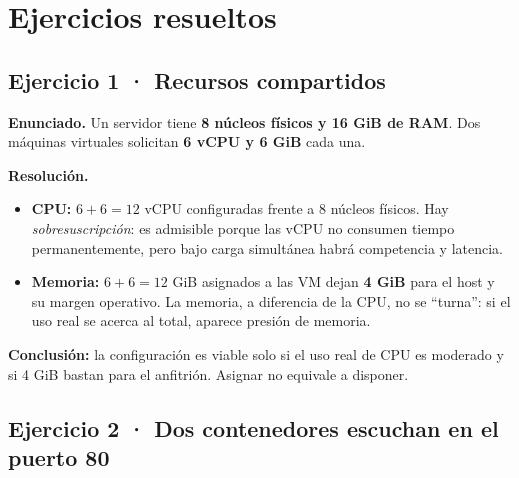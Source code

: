 \documentclass[11pt,a4paper]{article}
\begin{document}
\section{Ejercicios resueltos}

\subsection*{Ejercicio 1 · Recursos compartidos}

\textbf{Enunciado.} Un servidor tiene \textbf{8 núcleos físicos y 16 GiB de RAM}.
Dos máquinas virtuales solicitan \textbf{6 vCPU y 6 GiB} cada una.

\begin{center}
\end{center}

\textbf{Resolución.}
\begin{itemize}
  \item \textbf{CPU:} $6 + 6 = 12$ vCPU configuradas frente a 8 núcleos físicos.
        Hay \emph{sobresuscripción}: es admisible porque las vCPU no consumen tiempo
        permanentemente, pero bajo carga simultánea habrá competencia y latencia.
  \item \textbf{Memoria:} $6 + 6 = 12$ GiB asignados a las VM dejan \textbf{4 GiB} para el
        host y su margen operativo. La memoria, a diferencia de la CPU, no se
        \textquotedblleft turna\textquotedblright: si el uso real se acerca al total, aparece presión de memoria.
\end{itemize}

\begin{clave}
\textbf{Conclusión:} la configuración es viable solo si el uso real de CPU es moderado y
si 4 GiB bastan para el anfitrión. Asignar no equivale a disponer.
\end{clave}

\subsection*{Ejercicio 2 · Dos contenedores escuchan en el puerto 80}
\end{document}
